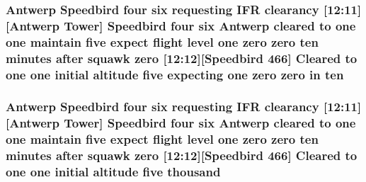 \subsubsection[{\texorpdfstring{ten}{ten}}]{\setlength{\rightskip}{0pt plus 5cm}Antwerp Speedbird four {\bf six} requesting I\+FR clearancy \mbox{[}12\+:11\mbox{]}\mbox{[}Antwerp {\bf Tower}\mbox{]} Speedbird four {\bf six} Antwerp cleared to {\bf one} {\bf one} maintain five expect flight level {\bf one} {\bf zero} {\bf zero} ten minutes after squawk {\bf zero} \mbox{[}12\+:12\mbox{]}\mbox{[}Speedbird 466\mbox{]} Cleared to {\bf one} {\bf one} initial altitude five expecting {\bf one} {\bf zero} {\bf zero} in ten}\hypertarget{happyDay4ExpectedATC_8txt_ab9794f8235db42812d8ddd9368cb321e}{}\label{happyDay4ExpectedATC_8txt_ab9794f8235db42812d8ddd9368cb321e}
\subsubsection[{\texorpdfstring{thousand}{thousand}}]{\setlength{\rightskip}{0pt plus 5cm}Antwerp Speedbird four {\bf six} requesting I\+FR clearancy \mbox{[}12\+:11\mbox{]}\mbox{[}Antwerp {\bf Tower}\mbox{]} Speedbird four {\bf six} Antwerp cleared to {\bf one} {\bf one} maintain five expect flight level {\bf one} {\bf zero} {\bf zero} {\bf ten} minutes after squawk {\bf zero} \mbox{[}12\+:12\mbox{]}\mbox{[}Speedbird 466\mbox{]} Cleared to {\bf one} {\bf one} initial altitude five thousand}\hypertarget{happyDay4ExpectedATC_8txt_a429913a0643fe14faca3dca538caa7bb}{}\label{happyDay4ExpectedATC_8txt_a429913a0643fe14faca3dca538caa7bb}
